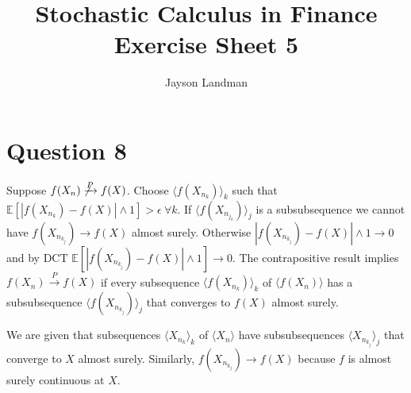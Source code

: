 \documentclass[12pt, letterpaper]{article}
\title{Stochastic Calculus in Finance\\
		\large Exercise Sheet 5}
\author{Jayson Landman}
\begin{document}
	\section*{Question 8}
	 
	 Suppose $f(X_n) \not \xrightarrow{P} f(X)$. \newline Choose $\langle f(X_{n_k})\rangle_k$ such that $\mathbb{E}[|f(X_{n_k}) - f(X)|\wedge 1] > \epsilon \: \forall k$. \newline
	If $\langle f(X_{n_{j_k}}) \rangle_j$ is a subsubsequence we cannot have $f(X_{n_{k_j}}) \rightarrow f(X)$ almost surely. \newline
	Otherwise $|f(X_{n_{k_j}}) - f(X)| \wedge 1 \rightarrow 0$ and by DCT $\mathbb{E}[|f(X_{n_{k_j}}) - f(X)| \wedge 1] \rightarrow 0$. \newline
	The contrapositive result implies $f(X_n) \xrightarrow{P} f(X)$ if every subsequence $\langle f(X_{n_k}) \rangle_k$ of $\langle f(X_n) \rangle$ has a subsubsequence $\langle f(X_{n_{k_j}}) \rangle_j$ that converges to $f(X)$ almost surely.
	 
	We are given that subsequences $\langle X_{n_k} \rangle_k$ of $\langle X_n \rangle$ have subsubsequences $\langle X_{n_{k_j}} \rangle_j$ that converge to $X$ almost surely. Similarly, $f(X_{n_{k_j}}) \rightarrow f(X)$ because $f$ is almost surely continuous at $X$.
\end{document}
